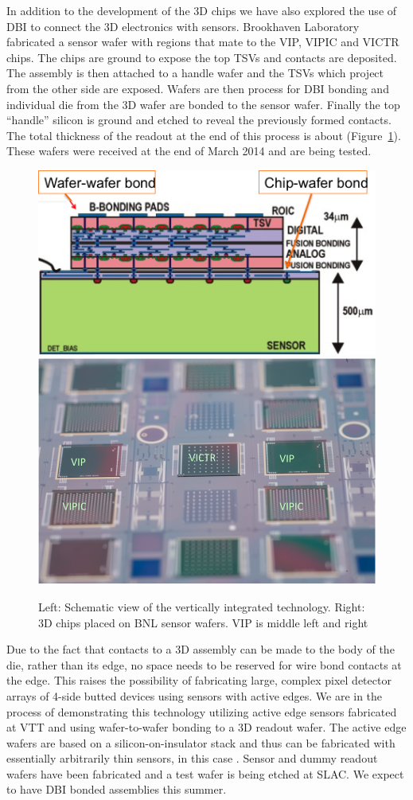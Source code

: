In addition to the development of the 3D chips we have also explored the use of DBI to connect the 3D electronics with sensors.  Brookhaven Laboratory fabricated a sensor wafer with regions that mate to the VIP, VIPIC and VICTR chips.  The chips are ground to expose the top TSVs and contacts are deposited. The assembly is then attached to a handle wafer and the TSVs which project from the other side are exposed.  Wafers are then process for DBI bonding and individual die from the 3D wafer are bonded to the sensor wafer.  Finally the top ``handle'' silicon is ground and etched to reveal the previously formed contacts.  The total thickness of the readout at the end of this process is about \unit[25]{\micron} (Figure~\ref{fig:VertexDetector:VIP:chipsOnBNLWafer}). These wafers were received at the end of March 2014 and are being tested.
\begin{figure}[hb]
    \centering
    \includegraphics[width=.495\textwidth]{VertexDetector/VIP/schematic}
    \includegraphics[width=.495\textwidth]{VertexDetector/VIP/3DChipsOnBNLWafers}
\caption{Left: Schematic view of the vertically integrated technology. Right: 3D chips placed on BNL sensor wafers. VIP is middle left and right}
\label{fig:VertexDetector:VIP:chipsOnBNLWafer}
\end{figure}
Due to the fact that contacts to a 3D assembly can be made to the body of the die, rather than its edge, no space needs to be reserved for wire bond contacts at the edge.  This raises the possibility of fabricating large, complex pixel detector arrays of 4-side butted devices using sensors with active edges.  We are in the process of demonstrating this technology utilizing active edge sensors fabricated at VTT and using wafer-to-wafer bonding to a 3D readout wafer. The active edge wafers are based on a silicon-on-insulator stack and thus can be fabricated with essentially arbitrarily thin sensors, in this case \unit[200]{\micron}. Sensor and dummy readout wafers have been fabricated and a test wafer is being etched at SLAC. We expect to have DBI bonded assemblies this summer.


